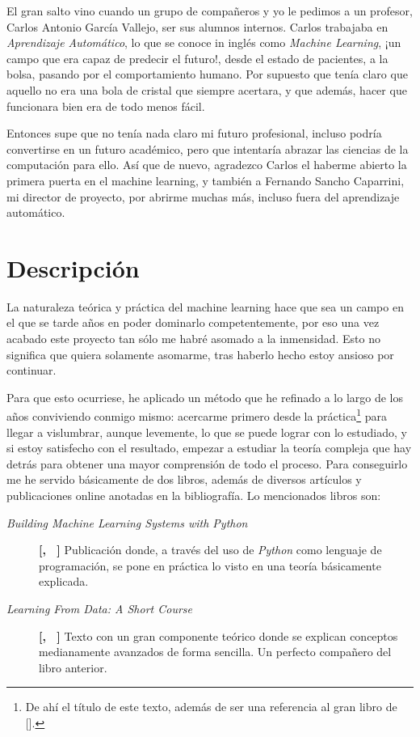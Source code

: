 El gran salto vino cuando un grupo de compañeros y yo le pedimos a un profesor, Carlos Antonio García Vallejo, ser sus alumnos internos. Carlos trabajaba en \emph{Aprendizaje Automático}, lo que se conoce in inglés como \emph{Machine Learning}, ¡un campo que era capaz de predecir el futuro!, desde el estado de pacientes, a la bolsa, pasando por el comportamiento humano. Por supuesto que tenía claro que aquello no era una bola de cristal que siempre acertara, y que además, hacer que funcionara bien era de todo menos fácil.

Entonces supe que no tenía nada claro mi futuro profesional, incluso podría convertirse en un futuro académico, pero que intentaría abrazar las ciencias de la computación para ello. Así que de nuevo, agradezco Carlos el haberme abierto la primera puerta en el machine learning, y también a Fernando Sancho Caparrini, mi director de proyecto, por abrirme muchas más, incluso fuera del aprendizaje automático.

\section{Descripción} \label{sec:1.2}

La naturaleza teórica y práctica del machine learning hace que sea un campo en el que se tarde años en poder dominarlo competentemente, por eso una vez acabado este proyecto tan sólo me habré asomado a la inmensidad. Esto no significa que quiera solamente asomarme, tras haberlo hecho estoy ansioso por continuar.

Para que esto ocurriese, he aplicado un método que he refinado a lo largo de los años conviviendo conmigo mismo: acercarme primero desde la práctica\footnote{De ahí el título de este texto, además de ser una referencia al gran libro de [\citeauthor{russell2003artificial}].} para llegar a vislumbrar, aunque levemente, lo que se puede lograr con lo estudiado, y si estoy satisfecho con el resultado, empezar a estudiar la teoría compleja que hay detrás para obtener una mayor comprensión de todo el proceso. Para conseguirlo me he servido básicamente de dos libros, además de diversos artículos y publicaciones online anotadas en la bibliografía. Lo mencionados libros son:

\begin{description}
\item[\emph{Building Machine Learning Systems with Python}] \textbf{[\citeauthor{richert2013building}, ~\citeyear{richert2013building}]} Publicación donde, a través del uso de \emph{Python} como lenguaje de programación, se pone en práctica lo visto en una teoría básicamente explicada.

\item[\emph{Learning From Data: A Short Course}] \textbf{[\citeauthor{abu2012learning}, ~\citeyear{abu2012learning}]} Texto con un gran componente teórico donde se explican conceptos medianamente avanzados de forma sencilla. Un perfecto compañero del libro anterior.
\end{description}

